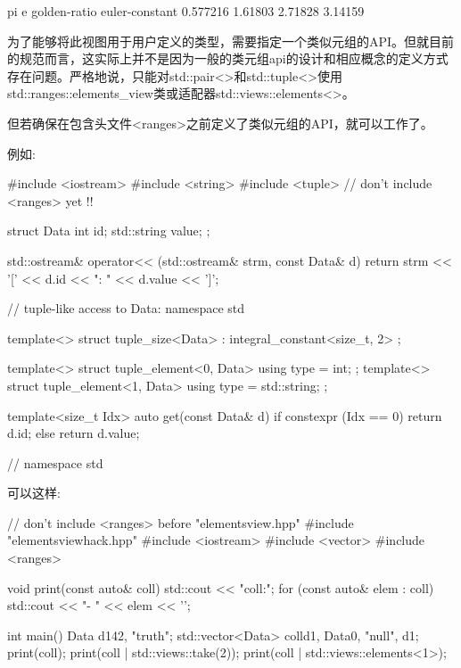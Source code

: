 \begin{shell}
pi e golden-ratio euler-constant
0.577216 1.61803 2.71828 3.14159
\end{shell}


为了能够将此视图用于用户定义的类型，需要指定一个类似元组的API。但就目前的规范而言，这实际上并不是因为一般的类元组api的设计和相应概念的定义方式存在问题。严格地说，只能对std::pair<>和std::tuple<>使用std::ranges::elements\_view类或适配器std::views::elements<>。

但若确保在包含头文件<ranges>之前定义了类似元组的API，就可以工作了。

例如:


\begin{cpp}
#include <iostream>
#include <string>
#include <tuple>
// don’t include <ranges> yet !!

struct Data {
	int id;
	std::string value;
};

std::ostream& operator<< (std::ostream& strm, const Data& d) {
	return strm << '[' << d.id << ": " << d.value << ']';
}

// tuple-like access to Data:
namespace std {
	template<>
	struct tuple_size<Data> : integral_constant<size_t, 2> {
	};
	
	template<>
	struct tuple_element<0, Data> {
		using type = int;
	};
	template<>
	struct tuple_element<1, Data> {
		using type = std::string;
	};
	
	template<size_t Idx> auto get(const Data& d) {
		if constexpr (Idx == 0) {
			return d.id;
		}
		else {
			return d.value;
		}
	}
} // namespace std
\end{cpp}

可以这样:


\begin{cpp}
// don’t include <ranges> before "elementsview.hpp"
#include "elementsviewhack.hpp"
#include <iostream>
#include <vector>
#include <ranges>

void print(const auto& coll)
{
	std::cout << "coll:\n";
	for (const auto& elem : coll) {
		std::cout << "- " << elem << '\n';
	}
}

int main()
{
	Data d1{42, "truth"};
	std::vector<Data> coll{d1, Data{0, "null"}, d1};
	print(coll);
	print(coll | std::views::take(2));
	print(coll | std::views::elements<1>);
}
\end{cpp}

